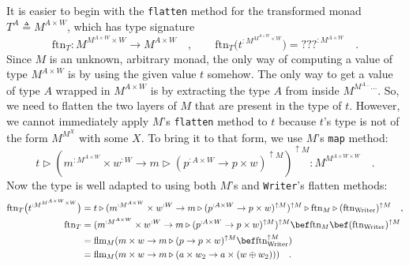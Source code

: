 It is easier to begin with the \lstinline!flatten! method for the
transformed monad $T^{A}\triangleq M^{A\times W}$, which has type
signature
\[
\text{ftn}_{T}:M^{M^{A\times W}\times W}\rightarrow M^{A\times W}\quad,\quad\quad\text{ftn}_{T}\big(t^{:M^{M^{A\times W}\times W}}\big)=\text{???}^{:M^{A\times W}}\quad.
\]
Since $M$ is an unknown, arbitrary monad, the only way of computing
a value of type $M^{A\times W}$ is by using the given value $t$
somehow. The only way to get a value of type $A$ wrapped in $M^{A\times W}$
is by extracting the type $A$ from inside $M^{M^{A...}...}$. So,
we need to flatten the two layers of $M$ that are present in the
type of $t$. However, we cannot immediately apply $M$\textsf{'}s \lstinline!flatten!
method to $t$ because $t$\textsf{'}s type is not of the form $M^{M^{X}}$
with some $X$. To bring it to that form, we use $M$\textsf{'}s \lstinline!map!
method:
\[
t\triangleright(m^{:M^{A\times W}}\times w^{:W}\rightarrow m\triangleright(p^{:A\times W}\rightarrow p\times w)^{\uparrow M})^{\uparrow M}:M^{M^{A\times W\times W}}\quad.
\]
Now the type is well adapted to using both $M$\textsf{'}s and \lstinline!Writer!\textsf{'}s
flatten methods:
\begin{align*}
\text{ftn}_{T}\big(t^{:M^{M^{A\times W}\times W}}\big) & =t\triangleright(m^{:M^{A\times W}}\times w^{:W}\rightarrow m\triangleright(p^{:A\times W}\rightarrow p\times w)^{\uparrow M})^{\uparrow M}\triangleright\text{ftn}_{M}\triangleright(\text{ftn}_{\text{Writer}})^{\uparrow M}\quad,\\
\text{ftn}_{T} & =(m^{:M^{A\times W}}\times w^{:W}\rightarrow m\triangleright(p^{:A\times W}\rightarrow p\times w)^{\uparrow M})^{\uparrow M}\bef\text{ftn}_{M}\bef(\text{ftn}_{\text{Writer}})^{\uparrow M}\\
 & =\text{flm}_{M}(m\times w\rightarrow m\triangleright(p\rightarrow p\times w)^{\uparrow M}\bef\text{ftn}_{\text{Writer}}^{\uparrow M})\\
 & =\text{flm}_{M}(m\times w\rightarrow m\triangleright(a\times w_{2}\rightarrow a\times(w\oplus w_{2})))\quad.
\end{align*}

